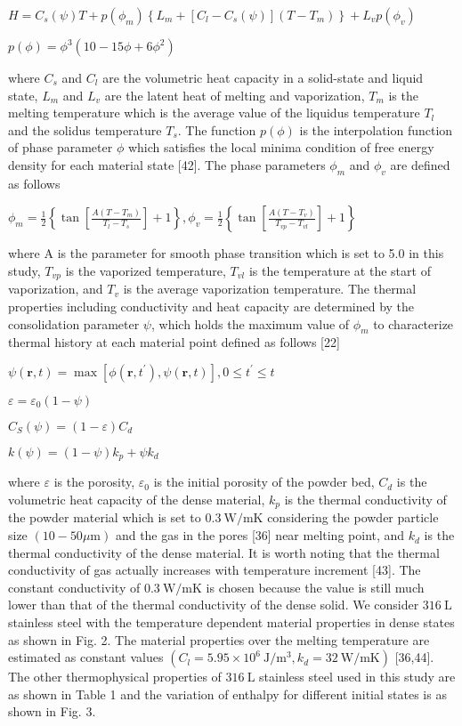 \documentclass[10pt]{article}
\begin{document}
$H=C_{s}(\psi) T+p\left(\phi_{m}\right)\left\{L_{m}+\left[C_{l}-C_{s}(\psi)\right]\left(T-T_{m}\right)\right\}+L_{v} p\left(\phi_{v}\right)$

$p(\phi)=\phi^{3}\left(10-15 \phi+6 \phi^{2}\right)$

where $C_{s}$ and $C_{l}$ are the volumetric heat capacity in a solid-state and liquid state, $L_{m}$ and $L_{v}$ are the latent heat of melting and vaporization, $T_{m}$ is the melting temperature which is the average value of the liquidus temperature $T_{l}$ and the solidus temperature $T_{s}$. The function $p(\phi)$ is the interpolation function of phase parameter $\phi$ which satisfies the local minima condition of free energy density for each material state [42]. The phase parameters $\phi_{m}$ and $\phi_{v}$ are defined as follows

$\phi_{m}=\frac{1}{2}\left\{\tan \left[\frac{A\left(T-T_{m}\right)}{T_{l}-T_{s}}\right]+1\right\}, \phi_{v}=\frac{1}{2}\left\{\tan \left[\frac{A\left(T-T_{v}\right)}{T_{v p}-T_{v l}}\right]+1\right\}$

where $\mathrm{A}$ is the parameter for smooth phase transition which is set to 5.0 in this study, $T_{v p}$ is the vaporized temperature, $T_{v l}$ is the temperature at the start of vaporization, and $T_{v}$ is the average vaporization temperature. The thermal properties including conductivity and heat capacity are determined by the consolidation parameter $\psi$, which holds the maximum value of $\phi_{m}$ to characterize thermal history at each material point defined as follows [22]

$\psi(\boldsymbol{r}, t)=\max \left[\phi\left(\boldsymbol{r}, t^{\prime}\right), \psi(\boldsymbol{r}, t)\right], 0 \leq t^{\prime} \leq t$

$\varepsilon=\varepsilon_{0}(1-\psi)$

$C_{S}(\psi)=(1-\varepsilon) C_{d}$

$k(\psi)=(1-\psi) k_{p}+\psi k_{d}$

where $\varepsilon$ is the porosity, $\varepsilon_{0}$ is the initial porosity of the powder bed, $C_{d}$ is the volumetric heat capacity of the dense material, $k_{p}$ is the thermal conductivity of the powder material which is set to $0.3 \mathrm{~W} / \mathrm{mK}$ considering the powder particle size $(10-50 \mu \mathrm{m})$ and the gas in the pores [36] near melting point, and $k_{d}$ is the thermal conductivity of the dense material. It is worth noting that the thermal conductivity of gas actually increases with temperature increment [43]. The constant conductivity of $0.3 \mathrm{~W} / \mathrm{mK}$ is chosen because the value is still much lower than that of the thermal conductivity of the dense solid. We consider $316 \mathrm{~L}$ stainless steel with the temperature dependent material properties in dense states as shown in Fig. 2. The material properties over the melting temperature are estimated as constant values $\left(C_{l}=5.95 \times 10^{6} \mathrm{~J} / \mathrm{m}^{3}, k_{d}=32 \mathrm{~W} / \mathrm{mK}\right)$ [36,44]. The other thermophysical properties of $316 \mathrm{~L}$ stainless steel used in this study are as shown in Table 1 and the variation of enthalpy for different initial states is as shown in Fig. 3.
\end{document}
